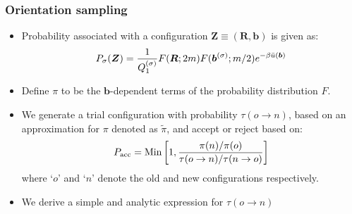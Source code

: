\documentclass[xcolor=svgnames]{beamer}
\DeclareRobustCommand{\mbf}[1]{{\boldsymbol {#1}}}
\begin{document}
        \fi
        \begin{frame}
            \frametitle{Orientation sampling}
            \begin{itemize}
                \item Probability associated with a configuration $\mbf{Z} \equiv (\mbf{R},\mbf{b})$ is given as:
                \begin{equation*}
                \label{eq:PIProb}
                    P_\sigma (\mbf{Z}) = \frac{1}{Q_1^{{\rm (\sigma)}}} F(\mbf{R};2m) F(\mbf{b}^{(\sigma)};m/2) e^{ - \beta \bar u(\mbf{b})}
                \end{equation*}
                \item Define $\pi$ to be the $\mbf{b}$-dependent terms of the probability distribution $F$.
                \item We generate a trial configuration with probability $\tau (o \to n)$, based on an approximation for $\pi$ denoted as $\tilde \pi$, and accept or reject based on:
                \begin{equation*}
                    \label{eq:Pacc}
                    P_{\rm acc} = \text{Min} \left[1, \frac{\pi(n)/\pi(o)}{\tau (o \to n)/\tau (n \to o)} \right]
                \end{equation*}
                where `$o$' and `$n$' denote the old and new configurations respectively.
                \item We derive a simple and analytic expression for $\tau (o \to n)$
            \end{itemize}
        \end{frame}
\end{document}
